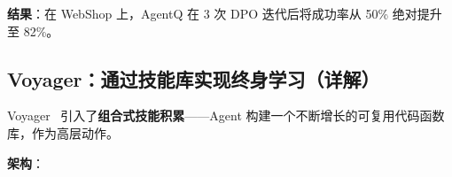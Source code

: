 \textbf{结果}：在 WebShop 上，AgentQ 在 3 次 DPO 迭代后将成功率从 50\% 绝对提升至 82\%。

\subsection{Voyager：通过技能库实现终身学习（详解）}
\label{voyager-lifelong-learning-via-skill-libraries-detailed}

Voyager~\cite{wang2023voyager} 引入了\textbf{组合式技能积累}——Agent 构建一个不断增长的可复用代码函数库，作为高层动作。

\textbf{架构}：

